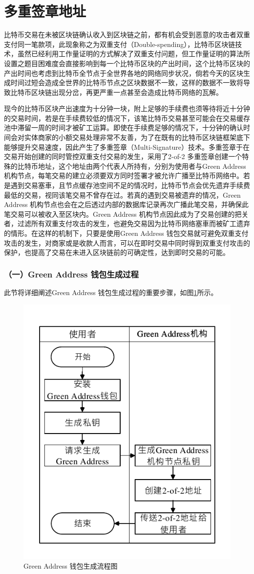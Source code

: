 			\section{多重签章地址}

			 	⽐特币交易在未被区块链确认收⼊到区块链之前，都有机会受到恶意的攻击者双重⽀付同⼀笔款项，此现象称之为双重⽀付（Double-spending）\supercite{Informationpropagationinthebitcoinnetwork}\supercite{Double-spendingfastpaymentsinbitcoin}，⽐特币区块链技术，虽然已经利⽤⼯作量证明的⽅式解决了双重⽀付问题，但工作量证明的算法所设置之题目困难度会直接影响到每一个比特币区块的产出时间，这个比特币区块的产出时间也考虑到比特币全节点于全世界各地的网络同步状况，倘若今天的区块生成时间过短会造成全世界的比特币节点之区块数据不一致，这样的数据不一致将导致比特币区块链出现分岔，再更严重一点甚至会造成比特币网络的瓦解。

			 	现今的⽐特币区块产出速度为⼗分钟⼀块，附上⾜够的⼿续费也须等待将近⼗分钟的交易时间，若是在⼿续费较低的情况下，该笔⽐特币交易甚⾄可能会在交易缓存池中滞留⼀周的时间才被矿工运算。即使在⼿续费⾜够的情况下，⼗分钟的确认时间会对实体商家的⼩额交易处理⾮常不友善，为了在既有的⽐特币区块链框架底下能够提升交易速度，因此产生了多重签章（Multi-Signature）技术。多重签章于在交易开始创建的同时管控双重⽀付交易的发⽣，采⽤了2-of-2 多重签章创建⼀个特殊的⽐特币地址，这个地址由两个代表⼈所持有，分别为使⽤者与Green Address\supercite{GreenAddress}机构节点，每笔交易的建⽴必须要双⽅同时签署才被允许广播⾄⽐特币网络中。若是遇到交易塞⾞，且节点缓存池空间不⾜的情况时，⽐特币节点会优先遗弃⼿续费最低的交易，视同该笔交易不曾存在过。若真的遇到交易被遗弃的情况，Green Address 机构节点也会在之后透过内部的数据库记录再次广播此笔交易，并确保此笔交易可以被收⼊⾄区块内。Green Address 机构节点因此成为了交易创建的把关者，过滤所有双重⽀付攻击的发⽣，也避免交易因为⽐特币网络塞⾞⽽被矿⼯遗弃的情形。在这样的机制下，只要是使⽤Green Address 钱包交易就可避免双重⽀付攻击的发⽣，对商家或是收款⼈⽽⾔，可以在即时交易中同时得到双重⽀付攻击的保护，也提高了交易在未进⼊区块链前的可确定性，达到即时交易的可能。

			 	\subsubsection{（一）Green Address 钱包生成过程}
			 	此节将详细阐述Green Address 钱包生成过程的重要步骤，如图\ref{gabuild}所示。
			 	\begin{figure}[!htbp]
					\centering
					\includegraphics[width = .4\textwidth]{gabuild.pdf}
					\caption{Green Address 钱包生成流程图}\label{gabuild}
				\end{figure}

